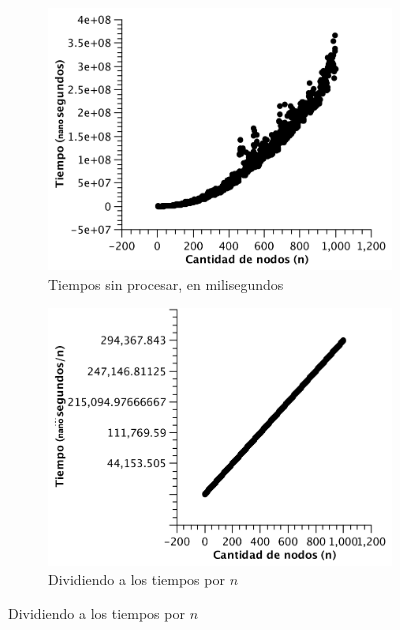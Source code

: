 \begin{figure}[H]
        \centering
\begin{subfigure}[b]{0.5\textwidth}
                \includegraphics[width=\textwidth]{imagenes/completo-listas-1.pdf}
                \caption{Tiempos sin procesar, en milisegundos}
        \end{subfigure}%

        \begin{subfigure}[b]{0.5\textwidth}
                \includegraphics[width=\textwidth]{imagenes/completo-listas-2.pdf}
                \caption{Dividiendo a los tiempos por $n$}
        \end{subfigure}
\end{figure}

